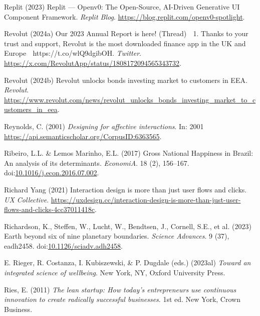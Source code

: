 \documentclass[
  letterpaper,
  DIV=11,
  numbers=noendperiod]{scrartcl}
\newlength{\cslhangindent}
\newenvironment{CSLReferences}[2] %
 {\begin{list}{}{%
  \setlength{\itemindent}{0pt}
  \setlength{\leftmargin}{0pt}
  \setlength{\parsep}{0pt}
  \ifodd #1
   \setlength{\leftmargin}{\cslhangindent}
   \setlength{\itemindent}{-1\cslhangindent}
  \fi
  \setlength{\itemsep}{#2\baselineskip}}}
 {\end{list}}
\begin{document}
\begin{CSLReferences}{0}{1}
Replit (2023) Replit --- {Openv0}: {The Open-Source}, {AI-Driven
Generative UI Component Framework}. \emph{Replit Blog}.
\url{https://blog.replit.com/openv0-spotlight}.

Revolut (2024a) Our 2023 {Annual Report} is here! ({Thread}) 🧵 1.
{Thanks} to your trust and support, {Revolut} is the most downloaded
finance app in the {UK} and {Europe} 🚀 {https://t.co/wlQ9dgibOH}.
\emph{Twitter}.
\url{https://x.com/RevolutApp/status/1808172094565343732}.

Revolut (2024b) Revolut unlocks bonds investing market to customers in
{EEA}. \emph{Revolut}.
\url{https://www.revolut.com/news/revolut_unlocks_bonds_investing_market_to_customers_in_eea}.

Reynolds, C. (2001) \emph{Designing for affective interactions}. In:
2001 \url{https://api.semanticscholar.org/CorpusID:6363565}.

Ribeiro, L.L. \& Lemos Marinho, E.L. (2017) Gross {National Happiness}
in {Brazil}: {An} analysis of its determinants. \emph{EconomiA}. 18 (2),
156--167.
doi:\href{https://doi.org/10.1016/j.econ.2016.07.002}{10.1016/j.econ.2016.07.002}.

Richard Yang (2021) Interaction design is more than just user flows and
clicks. \emph{UX Collective}.
\url{https://uxdesign.cc/interaction-design-is-more-than-just-user-flows-and-clicks-4cc37011418c}.

Richardson, K., Steffen, W., Lucht, W., Bendtsen, J., Cornell, S.E., et
al. (2023) Earth beyond six of nine planetary boundaries. \emph{Science
Advances}. 9 (37), eadh2458.
doi:\href{https://doi.org/10.1126/sciadv.adh2458}{10.1126/sciadv.adh2458}.

E. Rieger, R. Costanza, I. Kubiszewski, \& P. Dugdale (eds.) (2023al)
\emph{Toward an integrated science of wellbeing}. New York, NY, Oxford
University Press.

Ries, E. (2011) \emph{The lean startup: How today's entrepreneurs use
continuous innovation to create radically successful businesses}. 1st
ed. New York, Crown Business.


\end{CSLReferences}
\end{document}
